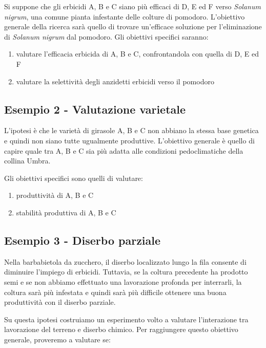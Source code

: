 \documentclass[a4paper,12pt,oneside]{book}
\providecommand{\tightlist}{%
  \setlength{\itemsep}{0pt}\setlength{\parskip}{0pt}}
\theoremstyle{definition}
\theoremstyle{definition}
\theoremstyle{definition}
\theoremstyle{remark}
\begin{document}
Si suppone che gli erbicidi A, B e C siano più efficaci di D, E ed F
verso \emph{Solanum nigrum}, una comune pianta infestante delle colture
di pomodoro. L'obiettivo generale della ricerca sarà quello di trovare
un'efficace soluzione per l'eliminazione di \emph{Solanum nigrum} dal
pomodoro. Gli obiettivi specifici saranno:

\begin{enumerate}
\def\labelenumi{\arabic{enumi}.}
\tightlist
\item
  valutare l'efficacia erbicida di A, B e C, confrontandola con quella
  di D, E ed F
\item
  valutare la selettività degli anzidetti erbicidi verso il pomodoro
\end{enumerate}

\subsection{Esempio 2 - Valutazione
varietale}\label{esempio-2---valutazione-varietale}

L'ipotesi è che le varietà di girasole A, B e C non abbiano la stessa
base genetica e quindi non siano tutte ugualmente produttive.
L'obiettivo generale è quello di capire quale tra A, B e C sia più
adatta alle condizioni pedoclimatiche della collina Umbra.

Gli obiettivi specifici sono quelli di valutare:

\begin{enumerate}
\def\labelenumi{\arabic{enumi}.}
\tightlist
\item
  produttività di A, B e C
\item
  stabilità produttiva di A, B e C
\end{enumerate}

\subsection{Esempio 3 - Diserbo
parziale}\label{esempio-3---diserbo-parziale}

Nella barbabietola da zucchero, il diserbo localizzato lungo la fila
consente di diminuire l'impiego di erbicidi. Tuttavia, se la coltura
precedente ha prodotto semi e se non abbiamo effettuato una lavorazione
profonda per interrarli, la coltura sarà più infestata e quindi sarà più
difficile ottenere una buona produttività con il diserbo parziale.

Su questa ipotesi costruiamo un esperimento volto a valutare
l'interazione tra lavorazione del terreno e diserbo chimico. Per
raggiungere questo obiettivo generale, proveremo a valutare se:
\end{document}
